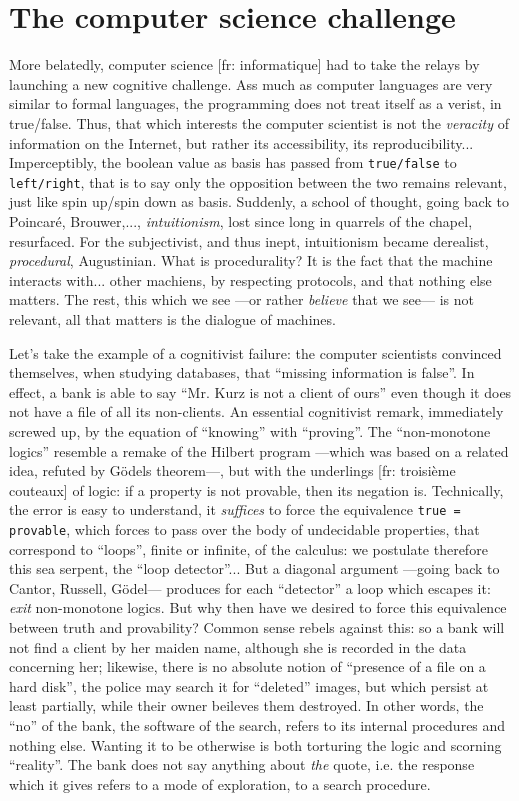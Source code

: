 \documentclass{article}
\begin{document}
\section{The computer science challenge}
More belatedly, computer science [fr: informatique] had to take the relays by launching a new cognitive challenge. Ass much as computer languages are very similar to formal languages, the programming does not treat itself as a verist, in true/false. Thus, that which interests the computer scientist is not the \emph{veracity} of information on the Internet, but rather its accessibility, its reproducibility... Imperceptibly, the boolean value as basis has passed from \texttt{true/false} to \texttt{left/right}, that is to say only the opposition between the two remains relevant, just like spin up/spin down as basis. Suddenly, a school of thought, going back to Poincaré, Brouwer,..., \emph{intuitionism}, lost since long in quarrels of the chapel, resurfaced. For the subjectivist, and thus inept, intuitionism became derealist, \emph{procedural}, Augustinian. What is procedurality? It is the fact that the machine interacts with... other machiens, by respecting protocols, and that nothing else matters. The rest, this which we see ---or rather \emph{believe} that we see--- is not relevant, all that matters is the dialogue of machines.

Let's take the example of a cognitivist failure: the computer scientists convinced themselves, when studying databases, that \enquote{missing information is false}. In effect, a bank is able to say \enquote{Mr. Kurz is not a client of ours} even though it does not have a file of all its non-clients. An essential cognitivist remark, immediately screwed up, by the equation of \enquote{knowing} with \enquote{proving}. The \enquote{non-monotone logics} resemble a remake of the Hilbert program ---which was based on a related idea, refuted by Gödels theorem---, but with the underlings [fr: troisième couteaux] of logic: if a property is not provable, then its negation is. Technically, the error is easy to understand, it \emph{suffices} to force the equivalence \texttt{true = provable}, which forces to pass over the body of undecidable properties, that correspond to \enquote{loops}, finite or infinite, of the calculus: we postulate therefore this sea serpent, the \enquote{loop detector}... But a diagonal argument ---going back to Cantor, Russell, Gödel--- produces for each \enquote{detector} a loop which escapes it: \emph{exit} non-monotone logics. But why then have we desired to force this equivalence between truth and provability? Common sense rebels against this: so a bank will not find a client by her maiden name, although she is recorded in the data concerning her; likewise, there is no absolute notion of \enquote{presence of a file on a hard disk}, the police may search it for \enquote{deleted} images, but which persist at least partially, while their owner beileves them destroyed. In other words, the \enquote{no} of the bank, the software of the search, refers to its internal procedures and nothing else. Wanting it to be otherwise is both torturing the logic and scorning \enquote{reality}. The bank does not say anything about \emph{the} quote, i.e. the response which it gives refers to a mode of exploration, to a search procedure.
\end{document}
